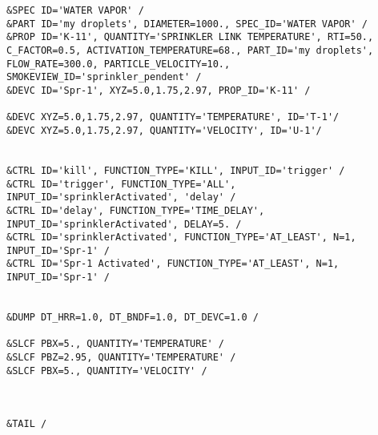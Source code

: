 \begin{lstlisting}[emptylines=0, basicstyle=\tiny]
&SPEC ID='WATER VAPOR' /
&PART ID='my droplets', DIAMETER=1000., SPEC_ID='WATER VAPOR' /
&PROP ID='K-11', QUANTITY='SPRINKLER LINK TEMPERATURE', RTI=50., C_FACTOR=0.5, ACTIVATION_TEMPERATURE=68., PART_ID='my droplets', FLOW_RATE=300.0, PARTICLE_VELOCITY=10., SMOKEVIEW_ID='sprinkler_pendent' /
&DEVC ID='Spr-1', XYZ=5.0,1.75,2.97, PROP_ID='K-11' /

&DEVC XYZ=5.0,1.75,2.97, QUANTITY='TEMPERATURE', ID='T-1'/
&DEVC XYZ=5.0,1.75,2.97, QUANTITY='VELOCITY', ID='U-1'/


&CTRL ID='kill', FUNCTION_TYPE='KILL', INPUT_ID='trigger' /
&CTRL ID='trigger', FUNCTION_TYPE='ALL', INPUT_ID='sprinklerActivated', 'delay' /
&CTRL ID='delay', FUNCTION_TYPE='TIME_DELAY', INPUT_ID='sprinklerActivated', DELAY=5. /
&CTRL ID='sprinklerActivated', FUNCTION_TYPE='AT_LEAST', N=1, INPUT_ID='Spr-1' /
&CTRL ID='Spr-1 Activated', FUNCTION_TYPE='AT_LEAST', N=1, INPUT_ID='Spr-1' /


&DUMP DT_HRR=1.0, DT_BNDF=1.0, DT_DEVC=1.0 /

&SLCF PBX=5., QUANTITY='TEMPERATURE' /
&SLCF PBZ=2.95, QUANTITY='TEMPERATURE' /
&SLCF PBX=5., QUANTITY='VELOCITY' /



&TAIL /


\end{lstlisting}

